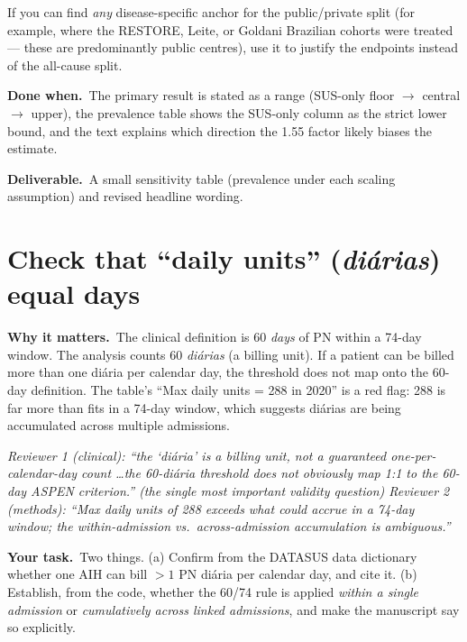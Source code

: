 \documentclass[11pt,a4paper]{article}
\newenvironment{reviewer}%
  {\def\FrameCommand{{\color{rulegray}\vrule width 1.5pt}\hspace{6pt}%
     \colorbox{quotebg}}%
   \MakeFramed{\advance\hsize-\width \FrameRestore}\small\itshape}%
  {\endMakeFramed}
\newcommand{\why}{\textbf{Why it matters.}\ }
\newcommand{\task}{\textbf{Your task.}\ }
\newcommand{\done}{\textbf{Done when.}\ }
\newcommand{\out}{\textbf{Deliverable.}\ }
\begin{document}
\noindent If you can find \emph{any} disease-specific anchor for the public/private split (for
example, where the RESTORE, Leite, or Goldani Brazilian cohorts were treated --- these are
predominantly public centres), use it to justify the endpoints instead of the all-cause split.

\done The primary result is stated as a range (SUS-only floor $\to$ central $\to$ upper), the
prevalence table shows the SUS-only column as the strict lower bound, and the text explains
which direction the 1.55 factor likely biases the estimate.

\out A small sensitivity table (prevalence under each scaling assumption) and revised headline
wording.

\section{Check that ``daily units'' (\emph{di\'{a}rias}) equal days}

\why The clinical definition is 60 \emph{days} of PN within a 74-day window. The analysis counts
60 \emph{di\'{a}rias} (a billing unit). If a patient can be billed more than one di\'{a}ria per
calendar day, the threshold does not map onto the 60-day definition. The table's ``Max daily
units = 288 in 2020'' is a red flag: 288 is far more than fits in a 74-day window, which
suggests di\'{a}rias are being accumulated across multiple admissions.

\begin{reviewer}
Reviewer 1 (clinical): ``the `di\'{a}ria' is a billing unit, not a guaranteed
one-per-calendar-day count \ldots the 60-di\'{a}ria threshold does not obviously map 1:1 to the
60-day ASPEN criterion.'' (the single most important validity question)
\end{reviewer}
\begin{reviewer}
Reviewer 2 (methods): ``Max daily units of 288 exceeds what could accrue in a 74-day window; the
within-admission vs.\ across-admission accumulation is ambiguous.''
\end{reviewer}

\task Two things. (a) Confirm from the DATASUS data dictionary whether one AIH can bill $>1$ PN
di\'{a}ria per calendar day, and cite it. (b) Establish, from the code, whether the 60/74 rule
is applied \emph{within a single admission} or \emph{cumulatively across linked admissions}, and
make the manuscript say so explicitly.
\end{document}
